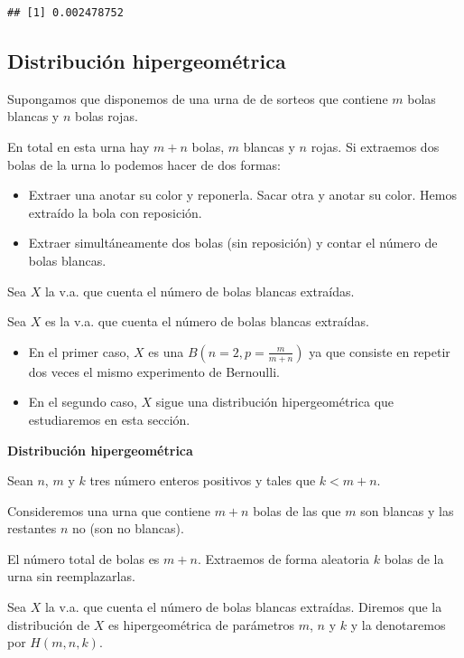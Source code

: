 \documentclass[]{book}
\providecommand{\tightlist}{%
  \setlength{\itemsep}{0pt}\setlength{\parskip}{0pt}}
\begin{document}
\begin{verbatim}
## [1] 0.002478752
\end{verbatim}

\hypertarget{distribuciuxf3n-hipergeomuxe9trica}{%
\subsection{Distribución hipergeométrica}\label{distribuciuxf3n-hipergeomuxe9trica}}

Supongamos que disponemos de una urna de de sorteos que contiene \(m\) bolas blancas y \(n\) bolas rojas.

En total en esta urna hay \(m+n\) bolas, \(m\) blancas y \(n\) rojas. Si extraemos dos bolas de la urna lo podemos hacer de dos formas:

\begin{itemize}
\tightlist
\item
  Extraer una anotar su color y reponerla. Sacar otra y anotar su color. Hemos extraído la bola con reposición.
\item
  Extraer simultáneamente dos bolas (sin reposición) y contar el número de bolas blancas.
\end{itemize}

Sea \(X\) la v.a. que cuenta el número de bolas blancas extraídas.

Sea \(X\) es la v.a. que cuenta el número de bolas blancas extraídas.

\begin{itemize}
\tightlist
\item
  En el primer caso, \(X\) es una \(B(n=2,p=\frac{m}{m+n})\) ya que consiste en repetir dos veces el mismo experimento de Bernoulli.
\item
  En el segundo caso, \(X\) sigue una distribución hipergeométrica que estudiaremos en esta sección.
\end{itemize}

\textbf{Distribución hipergeométrica}

Sean \(n\), \(m\) y \(k\) tres número enteros positivos y tales que \(k<m+n\).

Consideremos una urna que contiene \(m+n\) bolas de las que \(m\) son blancas y las restantes \(n\) no (son no blancas).

El número total de bolas es \(m+n\). Extraemos de forma aleatoria \(k\) bolas de la urna sin reemplazarlas.

Sea \(X\) la v.a. que cuenta el número de bolas blancas extraídas. Diremos que la distribución de \(X\) es hipergeométrica de parámetros \(m\), \(n\) y \(k\) y la denotaremos por \(H(m,n,k)\).
\end{document}
